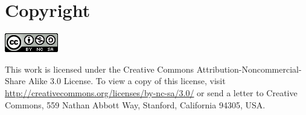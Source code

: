 \documentclass[
	12pt,
	a4paper,
	twoside,
	english,
	headsepline,
	footnosepline,
	automark,
	normalheadings,
	openany,
	cleardoubleplain,
	abstracton,
	idxtotoc,
	liststotoc,
	bibtotoc,
 	BCOR8mm,
]{scrartcl}
\begin{document}
\vfill
\section*{Copyright}
\begin{center}
 \includegraphics[scale=0.8]{byncsa30}
\end{center}
This work is licensed under the Creative Commons Attribution-Noncommercial-Share
Alike 3.0 License. To view a copy of this license, visit
\url{http://creativecommons.org/licenses/by-nc-sa/3.0/} or send a letter to
Creative Commons, 559 Nathan Abbott Way, Stanford, California 94305, USA.
\end{document}
